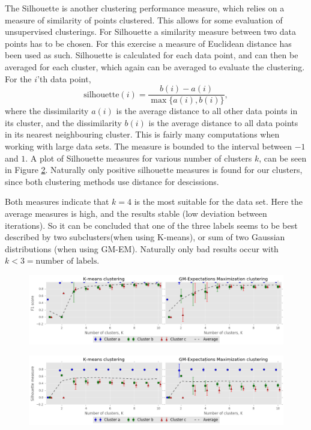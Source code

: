 \documentclass[a4paper,10pt,article,oneside,english]{memoir}
\let\oldcaption\caption
\renewcommand{\caption}[1]{\oldcaption{\emph{#1}}}
\begin{document}
The Silhouette is another clustering performance measure, which relies on a measure of similarity of points clustered. This allows for some evaluation of unsupervised clusterings. For Silhouette a similarity measure between two data points has to be chosen. For this exercise a measure of Euclidean distance has been used as such. Silhouette is calculated for each data point, and can then be averaged for each cluster, which again can be averaged to evaluate the clustering. For the $i$'th data point,
$$ \text{silhouette}(i) = \frac{b(i) - a(i)}{\max\{a(i), b(i)\}},$$
where the dissimilarity $a(i)$ is the average distance to all other data points in its cluster, and the dissimilarity $b(i)$ is the average distance to all data points in its nearest neighbouring cluster. This is fairly many computations when working with large data sets. The measure is bounded to the interval between $-1$ and $1$. A plot of Silhouette measures for various number of clusters $k$, can be seen in Figure \ref{fig:silhouette}. Naturally only positive silhouette measures is found for our clusters, since both clustering methods use distance for descissions. 

Both measures indicate that $k=4$ is the most suitable for the data set. Here the average measures is high, and the results stable (low deviation between iterations). So it can be concluded that one of the three labels seems to be best described by two subclusters(when using K-means), or sum of two Gaussian distributions (when using GM-EM). Naturally only bad results occur with $k<3=\text{number of labels}$. 

\begin{figure}
	\centering
	\includegraphics[width=\textwidth]{f1_vs_k.png}
	\caption{}
	\label{fig:f1}
\end{figure}

\begin{figure}
	\centering
	\includegraphics[width=\textwidth]{silhouette_vs_k.png}
	\caption{}
	\label{fig:silhouette}
\end{figure}
\end{document}
